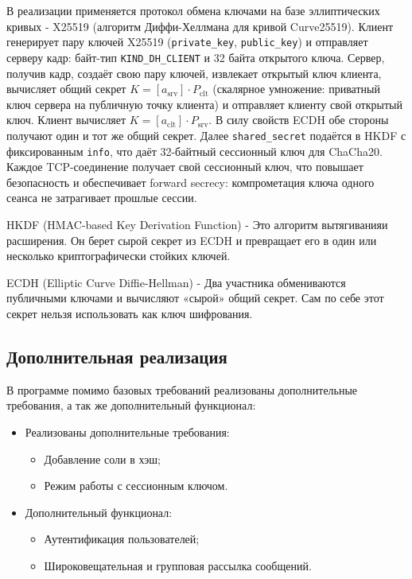 \documentclass[areasetadvanced]{scrartcl}
\begin{document}
В реализации применяется протокол обмена ключами на базе эллиптических кривых - X25519 (алгоритм Диффи-Хеллмана для кривой Curve25519). Клиент генерирует пару ключей X25519 (\texttt{private\_key}, \texttt{public\_key}) и отправляет серверу кадр: байт-тип \texttt{KIND\_DH\_CLIENT} и 32 байта открытого ключа. Сервер, получив кадр, создаёт свою пару ключей, извлекает открытый ключ клиента, вычисляет общий секрет $K = [a_{\mathrm{srv}}] \cdot P_{\mathrm{clt}}$ (скалярное умножение: приватный ключ сервера на публичную точку клиента) и отправляет клиенту свой открытый ключ. Клиент вычисляет $K = [a_{\mathrm{clt}}] \cdot P_{\mathrm{srv}}$. В силу свойств ECDH обе стороны получают один и тот же общий секрет. Далее \texttt{shared\_secret} подаётся в HKDF с фиксированным \texttt{info}, что даёт 32-байтный сессионный ключ для ChaCha20. Каждое TCP-соединение получает свой сессионный ключ, что повышает безопасность и обеспечивает forward secrecy: компрометация ключа одного сеанса не затрагивает прошлые сессии.

HKDF (HMAC-based Key Derivation Function) - Это алгоритм \guillemetleft вытягивания\guillemetright и \guillemetleft расширения\guillemetright. Он берет сырой секрет из ECDH и превращает его в один или несколько криптографически стойких ключей.

ECDH (Elliptic Curve Diffie-Hellman) - Два участника обмениваются публичными ключами и вычисляют «сырой» общий секрет. Сам по себе этот секрет нельзя использовать как ключ шифрования.
\subsection{Дополнительная реализация}
В программе помимо базовых требований реализованы дополнительные требования, а так же дополнительный функционал:

\begin{itemize}
    \item Реализованы дополнительные требования: \begin{itemize}
        \item Добавление соли в хэш;
        \item Режим работы с сессионным ключом.
    \end{itemize}
    \item Дополнительный функционал: \begin{itemize}
        \item Аутентификация пользователей;
        \item Широковещательная и групповая рассылка сообщений.
    \end{itemize}
\end{itemize}
\end{document}
